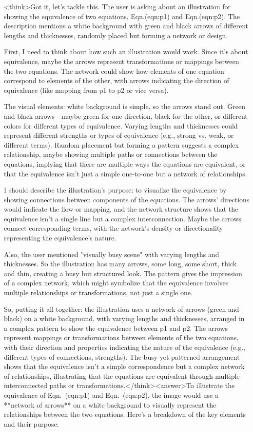 <think>Got it, let's tackle this. The user is asking about an illustration for showing the equivalence of two equations, Eqn.(eqn:p1) and Eqn.(eqn:p2). The description mentions a white background with green and black arrows of different lengths and thicknesses, randomly placed but forming a network or design. 

First, I need to think about how such an illustration would work. Since it's about equivalence, maybe the arrows represent transformations or mappings between the two equations. The network could show how elements of one equation correspond to elements of the other, with arrows indicating the direction of equivalence (like mapping from p1 to p2 or vice versa). 

The visual elements: white background is simple, so the arrows stand out. Green and black arrows—maybe green for one direction, black for the other, or different colors for different types of equivalence. Varying lengths and thicknesses could represent different strengths or types of equivalence (e.g., strong vs. weak, or different terms). Random placement but forming a pattern suggests a complex relationship, maybe showing multiple paths or connections between the equations, implying that there are multiple ways the equations are equivalent, or that the equivalence isn't just a simple one-to-one but a network of relationships.

I should describe the illustration's purpose: to visualize the equivalence by showing connections between components of the equations. The arrows' directions would indicate the flow or mapping, and the network structure shows that the equivalence isn't a single line but a complex interconnection. Maybe the arrows connect corresponding terms, with the network's density or directionality representing the equivalence's nature.

Also, the user mentioned "visually busy scene" with varying lengths and thicknesses. So the illustration has many arrows, some long, some short, thick and thin, creating a busy but structured look. The pattern gives the impression of a complex network, which might symbolize that the equivalence involves multiple relationships or transformations, not just a single one.

So, putting it all together: the illustration uses a network of arrows (green and black) on a white background, with varying lengths and thicknesses, arranged in a complex pattern to show the equivalence between p1 and p2. The arrows represent mappings or transformations between elements of the two equations, with their direction and properties indicating the nature of the equivalence (e.g., different types of connections, strengths). The busy yet patterned arrangement shows that the equivalence isn't a simple correspondence but a complex network of relationships, illustrating that the equations are equivalent through multiple interconnected paths or transformations.</think><answer>To illustrate the equivalence of Eqn.~(eqn:p1) and Eqn.~(eqn:p2), the image would use a **network of arrows** on a white background to visually represent the relationships between the two equations. Here’s a breakdown of the key elements and their purpose:  


